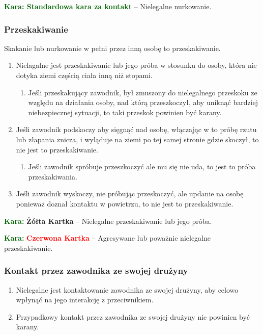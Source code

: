 \documentclass[11pt,a4paper]{article}
\newcommand\redcard[1]{\bgroup\textcolor{darkgreen}{\textbf{Kara: }}\bgroup\textcolor{red}{\textbf{Czerwona Kartka}} -- #1}
\newcommand\yellowcard[1]{\bgroup\textcolor{darkgreen}{\textbf{Kara: }}\bgroup\textcolor{darkyellow}{\textbf{Żółta Kartka}} -- #1}
\newcommand\penaltyd[2]{\bgroup\textcolor{darkgreen}{\textbf{Kara: #1}} -- #2}
\begin{document}
\penaltyd{Standardowa kara za kontakt}{Nielegalne nurkowanie.}

\subsubsection{Przeskakiwanie}
Skakanie lub nurkowanie w pełni przez inną osobę to przeskakiwanie.
\begin{enumerate}
  \item Nielagalne jest przeskakiwanie lub jego próba w stosunku do osoby, która nie dotyka ziemi częścią ciała inną niż stopami.
  \begin{enumerate}
    \item Jeśli przeskakujący zawodnik, był zmuszony do nielegalnego przeskoku ze względu na działania osoby, nad którą przeszkoczył, aby uniknąć bardziej niebezpiecznej sytuacji, to taki przeskok powinien być karany.
  \end{enumerate}
  \item Jeśli zawodnik podskoczy aby sięgnąć nad osobę, włączając w to próbę rzutu lub złapania znicza, i wyląduje na ziemi po tej samej stronie gdzie skoczył, to nie jest to przeskakiwanie.
  \begin{enumerate}
    \item Jeśli zawodnik spróbuje przeszkoczyć ale mu się nie uda, to jest to próba przeskakiwania.
  \end{enumerate}
  \item Jeśli zawodnik wyskoczy, nie próbując przeskoczyć, ale updanie na osobę ponieważ doznał kontaktu w powietrzu, to nie jest to przeskakiwanie.
\end{enumerate}

\yellowcard{Nielegalne przeskakiwanie lub jego próba.}

\redcard{Agresywane lub poważnie nielegalne przeskakiwanie.}

\subsubsection{Kontakt przez zawodnika ze swojej drużyny}
\begin{enumerate}
  \item Nielegalne jest kontaktowanie zawodnika ze swojej drużyny, aby celowo wpłynąć na jego interakcję z przeciwnikiem.
  \item Przypadkowy kontakt przez zawodnika ze swojej drużyny nie powinien być karany.
\end{enumerate}
\end{document}
